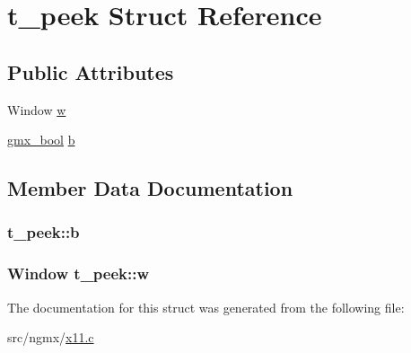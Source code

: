 \hypertarget{structt__peek}{\section{t\-\_\-peek \-Struct \-Reference}
\label{structt__peek}
}
\subsection*{\-Public \-Attributes}
\begin{DoxyCompactItemize}
\item 
\-Window \hyperlink{structt__peek_af6dfc246ed0f6e4d22e356a2b208f2df}{w}
\item 
\hyperlink{include_2types_2simple_8h_a8fddad319f226e856400d190198d5151}{gmx\-\_\-bool} \hyperlink{structt__peek_aa53e9f81e6a618b87d8f93d13615ce9c}{b}
\end{DoxyCompactItemize}


\subsection{\-Member \-Data \-Documentation}
\hypertarget{structt__peek_aa53e9f81e6a618b87d8f93d13615ce9c}{
\subsubsection[{b}]{ {\bf t\-\_\-peek\-::b}}}\label{structt__peek_aa53e9f81e6a618b87d8f93d13615ce9c}
\hypertarget{structt__peek_af6dfc246ed0f6e4d22e356a2b208f2df}{
\subsubsection[{w}]{\setlength{\rightskip}{0pt plus 5cm}\-Window {\bf t\-\_\-peek\-::w}}}\label{structt__peek_af6dfc246ed0f6e4d22e356a2b208f2df}


\-The documentation for this struct was generated from the following file\-:\begin{DoxyCompactItemize}
\item 
src/ngmx/\hyperlink{x11_8c}{x11.\-c}\end{DoxyCompactItemize}
